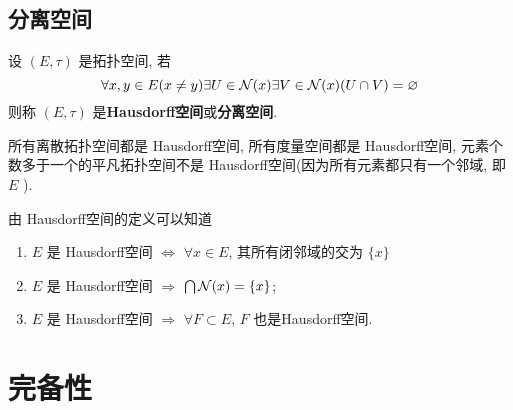      \subsection{分离空间}

     \begin{Definition}[Hausdorff空间]\label{def:Hausdorff空间}
          设 $ (E, \tau) $ 是拓扑空间, 若 
          \[
               \forall x, y\in E(x\neq y)\exists U\in \mathcal{N}(x)\exists V\in\mathcal{N}(x) (U\cap V)=\varnothing
          \]
          则称 $ (E, \tau) $ 是\textbf{Hausdorff空间}或\textbf{分离空间}. 
     \end{Definition}
     \begin{Example}
          所有离散拓扑空间都是 Hausdorff空间, 所有度量空间都是 Hausdorff空间, 元素个数多于一个的平凡拓扑空间不是 Hausdorff空间(因为所有元素都只有一个邻域, 即 $ E $ ). 
     \end{Example}
     \begin{Proposition}\label{prop:Hausdorff空间的相关命题1}
          由 Hausdorff空间的定义可以知道
          \begin{enumerate}[(1)]
               \item  $ E $ 是 Hausdorff空间 $ \Longleftrightarrow $ $ \forall x\in E $, 其所有闭邻域的交为 $\{ x \}$
               \item $ E $ 是 Hausdorff空间 $ \Longrightarrow $ $\bigcap \mathcal{N}(x)=\{x\}$;
               \item $ E $ 是 Hausdorff空间 $ \Longrightarrow $ $ \forall F\subset E $, $ F $ 也是Hausdorff空间. 
          \end{enumerate}
     \end{Proposition}
     
\section{完备性}
